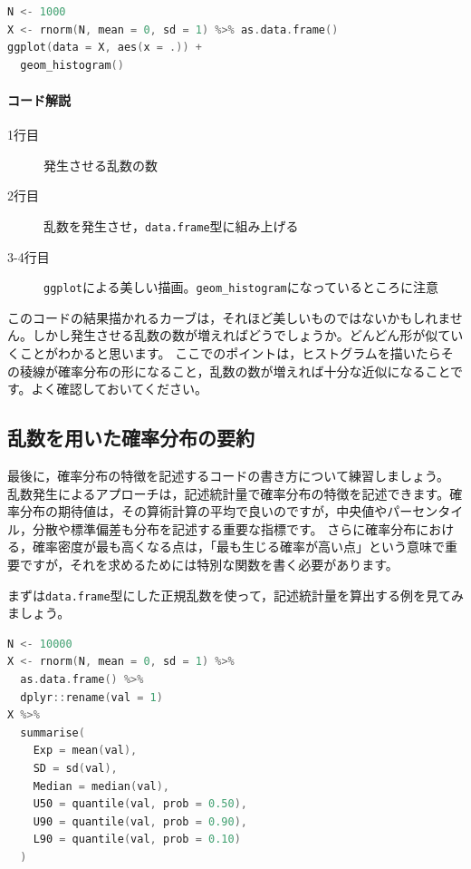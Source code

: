 \documentclass{ltjsbook}
\begin{document}
\begin{lstlisting}[language=c++,label={code::17_05},caption={確率分布の可視化2}]
N <- 1000
X <- rnorm(N, mean = 0, sd = 1) %>% as.data.frame()
ggplot(data = X, aes(x = .)) +
  geom_histogram()
\end{lstlisting}
\paragraph{コード解説}
    \begin{description}
            \item[1行目] 発生させる乱数の数
            \item[2行目] 乱数を発生させ，\texttt{data.frame}型に組み上げる
            \item[3-4行目] \texttt{ggplot}による美しい描画。\verb|geom_histogram|になっているところに注意
\end{description}
このコードの結果描かれるカーブは，それほど美しいものではないかもしれません。しかし発生させる乱数の数が増えればどうでしょうか。どんどん形が似ていくことがわかると思います。
ここでのポイントは，ヒストグラムを描いたらその稜線が確率分布の形になること，乱数の数が増えれば十分な近似になることです。よく確認しておいてください。

\subsection{乱数を用いた確率分布の要約}
最後に，確率分布の特徴を記述するコードの書き方について練習しましょう。
乱数発生によるアプローチは，記述統計量で確率分布の特徴を記述できます。確率分布の期待値は，その算術計算の平均で良いのですが，中央値やパーセンタイル，分散や標準偏差も分布を記述する重要な指標です。
さらに確率分布における，確率密度が最も高くなる点は，「最も生じる確率が高い点」という意味で重要ですが，それを求めるためには特別な関数を書く必要があります。

まずは\texttt{data.frame}型にした正規乱数を使って，記述統計量を算出する例を見てみましょう。

\begin{lstlisting}[language=c++,label={code::17_06},caption={確率分布の要約}]
N <- 10000
X <- rnorm(N, mean = 0, sd = 1) %>%
  as.data.frame() %>%
  dplyr::rename(val = 1)
X %>%
  summarise(
    Exp = mean(val),
    SD = sd(val),
    Median = median(val),
    U50 = quantile(val, prob = 0.50),
    U90 = quantile(val, prob = 0.90),
    L90 = quantile(val, prob = 0.10)
  )
\end{lstlisting}
\end{document}

